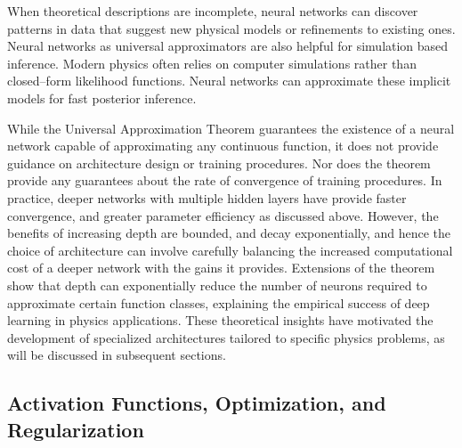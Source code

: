             When theoretical descriptions are incomplete, neural networks can discover patterns in data that suggest new physical models or refinements to existing ones.
            Neural networks as universal approximators are also helpful for simulation based inference.
            Modern physics often relies on computer simulations rather than closed--form likelihood functions.
            Neural networks can approximate these implicit models for fast posterior inference.

            While the Universal Approximation Theorem guarantees the existence of a neural network capable of approximating any continuous function, it does not provide guidance on architecture design or training procedures.
            Nor does the theorem provide any guarantees about the rate of convergence of training procedures.
            In practice, deeper networks with multiple hidden layers have provide faster convergence, and greater parameter efficiency as discussed above.
            However, the benefits of increasing depth are bounded, and decay exponentially, and hence the choice of architecture can involve carefully balancing the increased computational cost of a deeper network with the gains it provides.
            Extensions of the theorem show that depth can exponentially reduce the number of neurons required to approximate certain function classes, explaining the empirical success of deep learning in physics applications.
            These theoretical insights have motivated the development of specialized architectures tailored to specific physics problems, as will be discussed in subsequent sections.
    \subsection{Activation Functions, Optimization, and Regularization}
